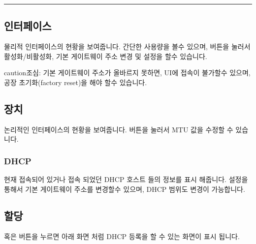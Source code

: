 \documentclass[letterpaper,10pt,english]{sphinxmanual}
\begin{document}
\bigskip\hrule\bigskip



\subsection{인터페이스}
\label{\detokenize{main_menu/network:id2}}
\noindent{}

\sphinxAtStartPar
물리적 인터페이스의 현황을 보여줍니다. 간단한 사용량을 볼수 있으며,  버튼을 눌러서 활성화/비활성화, 기본 게이트웨이 주소 변경 및 설정을 할수 있습니다.

\noindent{}

\begin{sphinxadmonition}{caution}{조심:}
\sphinxAtStartPar
기본 게이트웨이 주소가 올바르지 못하면, UI에 접속이 불가할수 있으며, 공장 초기화(factory reset)을 해야 할수 있습니다.
\end{sphinxadmonition}


\subsection{장치}
\label{\detokenize{main_menu/network:id3}}
\noindent{}

\sphinxAtStartPar
논리적인 인터페이스의 현황을 보여줍니다.  버튼을 눌러서 MTU 값을 수정할 수 있습니다.

\noindent{}


\subsubsection{DHCP}
\label{\detokenize{main_menu/network:dhcp}}
\sphinxAtStartPar
현재 접속되어 있거나 접속 되었던 DHCP 호스트 들의 정보를 표시 해줍니다. 설정을 통해서 기본 게이트웨이 주소를 변경할수 있으며, DHCP 범위도 변경이 가능합니다.


\subsection{할당}
\label{\detokenize{main_menu/network:id4}}
\noindent{}

\sphinxAtStartPar
{} 혹은  버튼을 누르면 아래 화면 처럼 DHCP 등록을 할 수 있는 화면이 표시 됩니다.
\end{document}
